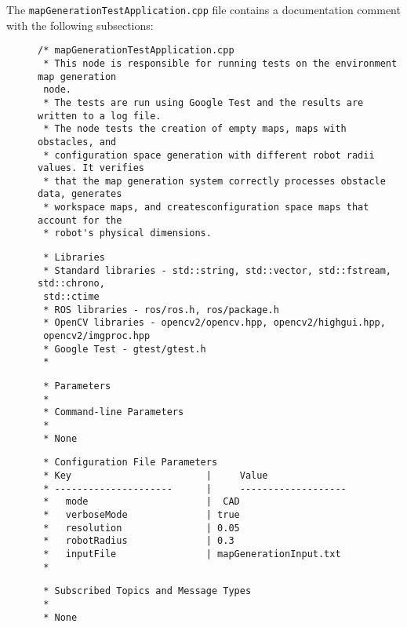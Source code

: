 \documentclass{CSSRforAfrica}
\newcommand{\blank}{~\\}
\newcommand{\checkboxChecked}{\fbox{\ding{51}}} %
\begin{document}
%
\noindent The {\small \verb+mapGenerationTestApplication.cpp+} file contains a documentation comment with the following subsections:

\begin{description}

\item[\checkboxChecked] 
 {\small 
\begin{verbatim}
/* mapGenerationTestApplication.cpp
 * This node is responsible for running tests on the environment map generation 
 node.
 * The tests are run using Google Test and the results are written to a log file.
 * The node tests the creation of empty maps, maps with obstacles, and 
 * configuration space generation with different robot radii values. It verifies 
 * that the map generation system correctly processes obstacle data, generates 
 * workspace maps, and createsconfiguration space maps that account for the 
 * robot's physical dimensions.
\end{verbatim}}

\item[\checkboxChecked] 
 {\small 
\begin{verbatim}
 * Libraries
 * Standard libraries - std::string, std::vector, std::fstream, std::chrono, 
 std::ctime
 * ROS libraries - ros/ros.h, ros/package.h
 * OpenCV libraries - opencv2/opencv.hpp, opencv2/highgui.hpp, 
 opencv2/imgproc.hpp
 * Google Test - gtest/gtest.h
 *
\end{verbatim}}

\item[\checkboxChecked] 
 {\small 
\begin{verbatim}
 * Parameters
 *
 * Command-line Parameters
 *
 * None
\end{verbatim}}

\newpage
\item[\checkboxChecked] 
 {\small 
\begin{verbatim}
 * Configuration File Parameters
 * Key                        |     Value
 * ---------------------      |     -------------------
 *   mode                     |  CAD
 *   verboseMode              | true
 *   resolution               | 0.05
 *   robotRadius              | 0.3
 *   inputFile                | mapGenerationInput.txt
 *
\end{verbatim}}

\item[\checkboxChecked] 
 {\small 
\begin{verbatim}
 * Subscribed Topics and Message Types
 *
 * None
\end{verbatim}}


\end{description}
\end{document}
